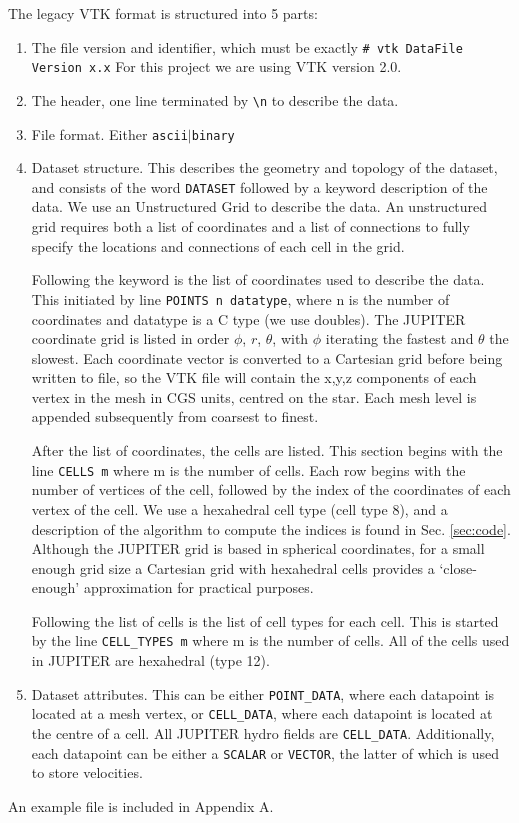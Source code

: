 \documentclass[preprint2]{aastex62}
\begin{document}
The legacy VTK format is structured into 5 parts:
\begin{enumerate}
	\item The file version and identifier, which must be exactly \verb|# vtk DataFile Version x.x|
	For this project we are using VTK version 2.0.
	\item The header, one line terminated by \verb|\n| to describe the data.
	\item File format. Either \verb|ascii|$\lvert$\verb|binary|
	\item Dataset structure. This describes the geometry and topology of the dataset, and consists of the word \verb|DATASET| followed by a keyword description of the data. We use an Unstructured Grid to describe the data.
	An unstructured grid requires both a list of coordinates and a list of connections to fully specify the locations and connections of each cell in the grid.
	
	Following the keyword is the list of coordinates used to describe the data. This initiated by line \verb|POINTS n datatype|, where n is the number of coordinates and datatype is a C type (we use doubles). The JUPITER coordinate grid is listed in order $\phi$, $r$, $\theta$, with $\phi$ iterating the fastest and $\theta$ the slowest. Each coordinate vector is converted to a Cartesian grid before being written to file, so the VTK file will contain the x,y,z components of each vertex in the mesh in CGS units, centred on the star. Each mesh level is appended subsequently from coarsest to finest. 
	
	After the list of coordinates, the cells are listed. This section begins with the line \verb|CELLS m| where m is the number of cells. Each row begins with the number of vertices of the cell, followed by the index of the coordinates of each vertex of the cell. We use a hexahedral cell type (cell type 8), and a description of the algorithm to compute the indices is found in Sec. \ref{sec:code}. Although the JUPITER grid is based in spherical coordinates, for a small enough grid size a Cartesian grid with hexahedral cells provides a `close-enough' approximation for practical purposes.
	
	Following the list of cells is the list of cell types for each cell. This is started by the line \verb|CELL_TYPES m| where m is the number of cells. All of the cells used in JUPITER are hexahedral (type 12).
	\item Dataset attributes. This can be either \verb|POINT_DATA|, where each datapoint is located at a mesh vertex, or \verb|CELL_DATA|, where each datapoint is located at the centre of a cell. All JUPITER hydro fields are \verb|CELL_DATA|. Additionally, each datapoint can be either a \verb|SCALAR| or \verb|VECTOR|, the latter of which is used to store velocities.
\end{enumerate}
An example file is included in Appendix A.
\end{document}
